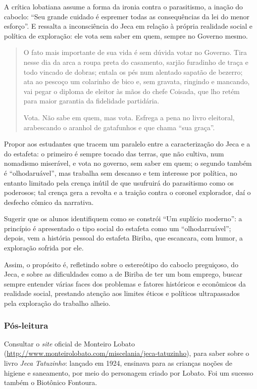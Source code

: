\documentclass[12pt]{extarticle}
\begin{document}
A crítica lobatiana assume a forma da ironia contra o parasitismo, a
inação do caboclo: ``Seu grande cuidado é espremer todas as
consequências da lei do menor esforço''. E ressalta a inconsciência do
Jeca em relação à própria realidade social e política de exploração: ele
vota sem saber em quem, sempre no Governo mesmo.

\begin{quote}
O fato mais importante de sua vida é sem dúvida votar no Governo. Tira
nesse dia da arca a roupa preta do casamento, sarjão furadinho de traça
e todo vincado de dobras; entala os pés num alentado sapatão de bezerro;
ata ao pescoço um colarinho de bico e, sem gravata, ringindo e mancando,
vai pegar o diploma de eleitor às mãos do chefe Coisada, que lho retém
para maior garantia da fidelidade partidária.

Vota. Não sabe em quem, mas vota. Esfrega a pena no livro eleitoral,
arabescando o aranhol de gatafunhos e que chama ``sua graça''.
\end{quote}

Propor aos estudantes que tracem um paralelo entre a caracterização do
Jeca e a do estafeta: o primeiro é sempre tocado das terras, que não
cultiva, num nomadismo miserável, e vota no governo, sem saber em quem;
o segundo também é ``olhodaruável'', mas trabalha sem descanso e tem
interesse por política, no entanto limitado pela crença inútil de que
usufruirá do parasitismo como os poderosos; tal crença gera a revolta e
a traição contra o coronel explorador, daí o desfecho cômico da
narrativa.

Sugerir que os alunos identifiquem como se constrói ``Um suplício
moderno'': a princípio é apresentado o tipo social do estafeta como um
``olhodarruável''; depois, vem a história pessoal do estafeta Biriba,
que escancara, com humor, a exploração sofrida por ele.

Assim, o propósito é, refletindo sobre o estereótipo do caboclo
preguiçoso, do Jeca, e sobre as dificuldades como a de Biriba de ter um
bom emprego, buscar sempre entender várias faces dos problemas e fatores
históricos e econômicos da realidade social, prestando atenção aos
limites éticos e políticos ultrapassados pela exploração do trabalho
alheio.

\subsubsection{Pós-leitura}

Consultar o \emph{site} oficial de Monteiro Lobato
(\url{http://www.monteirolobato.com/miscelania/jeca-tatuzinho}), para
saber sobre o livro \emph{Jeca Tatuzinho}: lançado em 1924, ensinava
para as crianças noções de higiene e saneamento, por meio do personagem
criado por Lobato. Foi um sucesso também o Biotônico Fontoura.
\end{document}
